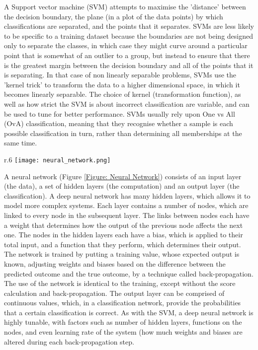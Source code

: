 \documentclass[12pt]{article}
\begin{document}
				A Support vector machine (SVM) attempts to maximise the 'distance' between the decision boundary, the plane (in a plot of the data points) by which classifications are separated, and the points that it separates.  SVMs are less likely to be specific to a training dataset because the boundaries are not being designed only to separate the classes, in which case they might curve around a particular point that is somewhat of an outlier to a group, but instead to ensure that there is the greatest margin between the decision boundary and all of the points that it is separating.  In that case of non linearly separable problems, SVMs use the 'kernel trick' to transform the data to a higher dimensional space, in which it becomes linearly separable.  The choice of kernel (transformation function), as well as how strict the SVM is about incorrect classification are variable, and can be used to tune for better performance.  SVMs usually rely upon One vs All (OvA) classification, meaning that they recognise whether a sample is each possible classification in turn, rather than determining all memberships at the same time.
		
		\begin{wrapfigure}{r}{.6\textwidth}
			\centering
			\texttt{[image: neural\_network.png]}
			\caption{A simple illustration of a neural network with 3 hidden layers.  Weights are applied on the connections between nodes, and biases are applied on the nodes themselves, before functions are applied}
			\label{Figure: Neural Network}
		\end{wrapfigure}
		
				A neural network (Figure \ref{Figure: Neural Network}) consists of an input layer (the data), a set of hidden layers (the computation) and an output layer (the classification).  A deep neural network has many hidden layers, which allows it to model more complex systems.  Each layer contains a number of nodes, which are linked to every node in the subsequent layer.  The links between nodes each have a weight that determines how the output of the previous node affects the next one.  The nodes in the hidden layers each have a bias, which is applied to their total input, and a function that they perform, which determines their output.  The network is trained by putting a training value, whose expected output is known,  adjusting weights and biases based on the difference between the predicted outcome and the true outcome, by a technique called back-propagation.  The use of the network is identical to the training, except without the score calculation and back-propagation.  The output layer can be comprised of continuous values, which, in a classification network, provide the probabilities that a certain classification is correct.  As with the SVM, a deep neural network is highly tunable, with factors such as number of hidden layers, functions on the nodes, and even learning rate of the system (how much weights and biases are altered during each back-propagation step.		
		
\end{document}
